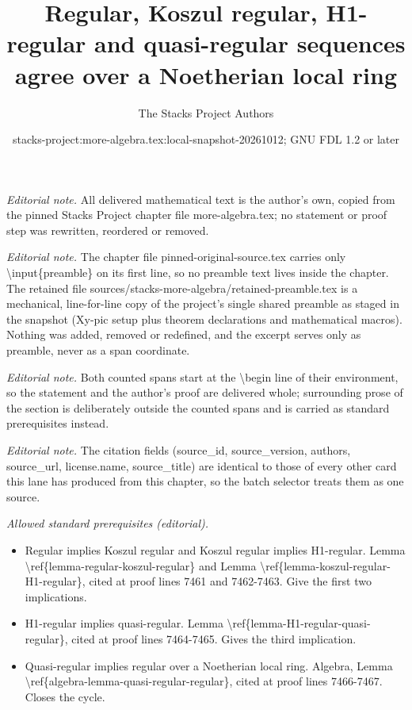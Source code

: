 \documentclass[10pt,a4paper]{amsart}
\title{Regular, Koszul regular, H1-regular and quasi-regular sequences agree over a Noetherian local ring}
\author{The Stacks Project Authors}
\date{stacks-project:more-algebra.tex:local-snapshot-20261012; GNU FDL 1.2 or later}
\theoremstyle{plain}
\theoremstyle{definition}
\theoremstyle{remark}
\numberwithin{equation}{subsection}
\begin{document}
\maketitle
\setcounter{subsection}{1}
\noindent\textit{Editorial note.} All delivered mathematical text is the author's own, copied from the pinned Stacks Project chapter file more-algebra.tex; no statement or proof step was rewritten, reordered or removed.\par\medskip
\noindent\textit{Editorial note.} The chapter file pinned-original-source.tex carries only \textbackslash{}input\{preamble\} on its first line, so no preamble text lives inside the chapter. The retained file sources/stacks-more-algebra/retained-preamble.tex is a mechanical, line-for-line copy of the project's single shared preamble as staged in the snapshot (Xy-pic setup plus theorem declarations and mathematical macros). Nothing was added, removed or redefined, and the excerpt serves only as preamble, never as a span coordinate.\par\medskip
\noindent\textit{Editorial note.} Both counted spans start at the \textbackslash{}begin line of their environment, so the statement and the author's proof are delivered whole; surrounding prose of the section is deliberately outside the counted spans and is carried as standard prerequisites instead.\par\medskip
\noindent\textit{Editorial note.} The citation fields (source\_id, source\_version, authors, source\_url, license.name, source\_title) are identical to those of every other card this lane has produced from this chapter, so the batch selector treats them as one source.\par\medskip
\noindent\textit{Allowed standard prerequisites (editorial).}\begin{itemize}
\item Regular implies Koszul regular and Koszul regular implies H1-regular. Lemma \textbackslash{}ref\{lemma-regular-koszul-regular\} and Lemma \textbackslash{}ref\{lemma-koszul-regular-H1-regular\}, cited at proof lines 7461 and 7462-7463. Give the first two implications.
\item H1-regular implies quasi-regular. Lemma \textbackslash{}ref\{lemma-H1-regular-quasi-regular\}, cited at proof lines 7464-7465. Gives the third implication.
\item Quasi-regular implies regular over a Noetherian local ring. Algebra, Lemma \textbackslash{}ref\{algebra-lemma-quasi-regular-regular\}, cited at proof lines 7466-7467. Closes the cycle.
\end{itemize}\medskip
\end{document}

